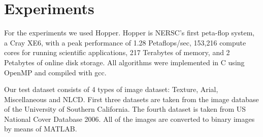 \section{Experiments}

For the experiments we used Hopper. Hopper is NERSC's first peta-flop system, a Cray XE6, with a peak performance of 1.28 Petaflops/sec, 
153,216 compute cores for running scientific applications, 217 Terabytes of memory, and 2 Petabytes of online disk storage. All algorithms
were implemented in C using OpenMP and compiled with gcc.

Our test dataset consists of 4 types of image dataset: Texture, Arial, Miscellaneous and NLCD. First three datasets are taken from the image database
of the University of Southern California. The fourth dataset is taken from US National Cover Database 2006. All of the images are converted to binary
images by means of MATLAB.


